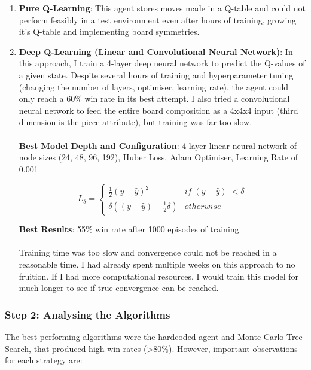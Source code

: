 \begin{enumerate}
    \item \textbf{Pure Q-Learning}: This agent stores moves made in a Q-table and could not perform feasibly in a test environment even after hours of training, growing it's Q-table and implementing board symmetries.
    \item \textbf{Deep Q-Learning (Linear and Convolutional Neural Network)}: In this approach, I train a 4-layer deep neural network to predict the Q-values of a given state. Despite several hours of training and hyperparameter tuning (changing the number of layers, optimiser, learning rate), the agent could only reach a 60\% win rate in its best attempt. I also tried a convolutional neural network to feed the entire board composition as a 4x4x4 input (third dimension is the piece attribute), but training was far too slow.  \\ \\
    \textbf{Best Model Depth and Configuration}: 4-layer linear neural network of node sizes (24, 48, 96, 192), Huber Loss, Adam Optimiser, Learning Rate of 0.001

    \begin{equation*}
        L_{\delta}=
    \left\{\begin{matrix}
        \frac{1}{2}(y - \hat{y})^{2} & if \left | (y - \hat{y})  \right | < \delta\\
        \delta ((y - \hat{y}) - \frac1 2 \delta) & otherwise
    \end{matrix}\right.
    \end{equation*}

    \textbf{Best Results}: 55\% win rate after 1000 episodes of training \\ \\
    Training time was too slow and convergence could not be reached in a reasonable time. I had already spent multiple weeks on this approach to no fruition. If I had more computational resources, I would train this model for much longer to see if true convergence can be reached.
\end{enumerate}

\subsubsection{Step 2: Analysing the Algorithms}

The best performing algorithms were the hardcoded agent and Monte Carlo Tree Search, that produced high win rates (>80\%). However, important observations for each strategy are:

